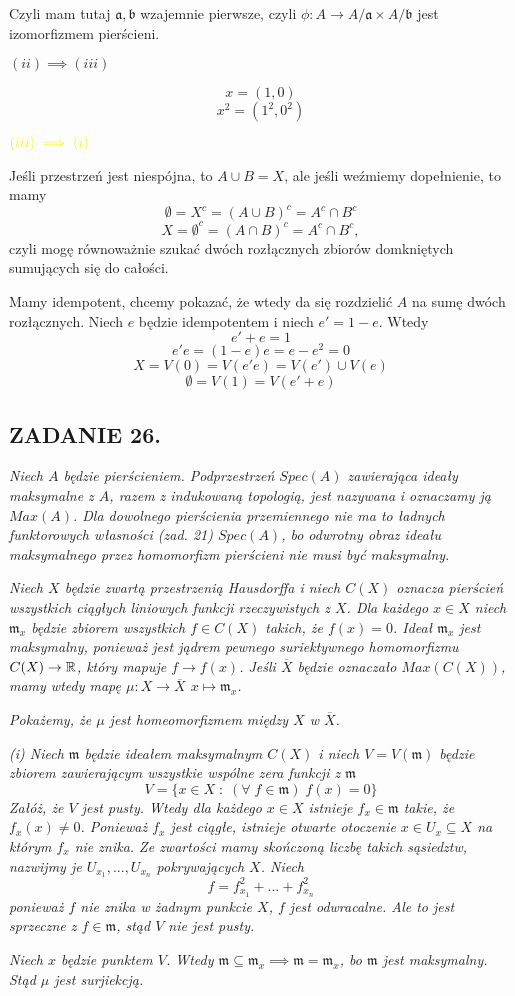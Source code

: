 \documentclass{article}
\begin{document}
Czyli mam tutaj $\mathfrak{a},\mathfrak{b}$ wzajemnie pierwsze, czyli $\phi:A\to A/\mathfrak{a}\times A/\mathfrak{b}$ jest izomorfizmem pierścieni.

$(ii)\implies (iii)$

$$x=(1, 0)$$
$$x^2=(1^2, 0^2)$$

$\color{yellow}(iii)\implies(i)$

Jeśli przestrzeń jest niespójna, to $A\cup B=X$, ale jeśli weźmiemy dopełnienie, to mamy 
$$\emptyset=X^c=(A\cup B)^c=A^c\cap B^c$$
$$X=\emptyset^c=(A\cap B)^c=A^c\cap B^c,$$ czyli mogę równoważnie szukać dwóch rozłącznych zbiorów domkniętych sumujących się do całości.

Mamy idempotent, chcemy pokazać, że wtedy da się rozdzielić $A$ na sumę dwóch rozłącznych. Niech $e$ będzie idempotentem i niech $e'=1-e$. Wtedy
$$e'+e=1$$
$$e'e=(1-e)e=e-e^2=0$$
$$X=V(0)=V(e'e)=V(e')\cup V(e)$$
$$\emptyset=V(1)=V(e'+e)$$

\subsection*{ZADANIE 26.}
\emph{\color{pink}Niech $A$ będzie pierścieniem. Podprzestrzeń $Spec(A)$ zawierająca ideały maksymalne z $A$, razem z indukowaną topologią, jest nazywana}\emph{\color{pink} i oznaczamy ją $Max(A)$. Dla dowolnego pierścienia przemiennego nie ma to ładnych funktorowych własności (zad. 21) $Spec(A)$, bo odwrotny obraz ideału maksymalnego przez homomorfizm pierścieni nie musi być maksymalny.}

\emph{\color{pink}Niech $X$ będzie zwartą przestrzenią Hausdorffa i niech $C(X)$ oznacza pierścień wszystkich ciągłych liniowych funkcji rzeczywistych z $X$. Dla każdego $x\in X$ niech $\mathfrak{m}_x$ będzie zbiorem wszystkich $f\in C(X)$ takich, że $f(x)=0$. Ideał $\mathfrak{m}_x$ jest maksymalny, ponieważ jest jądrem pewnego suriektywnego homomorfizmu $C(X)\to\mathbb{R}$, który mapuje $f\to f(x)$. Jeśli $\overline X$ będzie oznaczało $Max(C(X))$, mamy wtedy mapę $\mu :X\to\overline X$ $x\mapsto \mathfrak{m}_x$.}

\emph{\color{pink}Pokażemy, że $\mu$ jest homeomorfizmem między $X$ w $\overline X$.}

{\color{yellow}\emph{(i) Niech $\mathfrak{m}$ będzie ideałem maksymalnym $C(X)$ i niech $V =V(\mathfrak{m})$ będzie zbiorem zawierającym wszystkie wspólne zera funkcji z $\mathfrak{m}$}
$$V=\{x\in X\;:\;(\forall\;f\in\mathfrak{m})\;f(x)=0\}$$
\emph{Załóż, że $V$ jest pusty. Wtedy dla każdego $x\in X$ istnieje $f_x\in\mathfrak{m}$ takie, że $f_x(x)\neq 0$. Ponieważ $f_x$ jest ciągłe, istnieje otwarte otoczenie $x\in U_x\subseteq X$ na którym $f_x$ nie znika. Ze zwartości mamy skończoną liczbę takich sąsiedztw, nazwijmy je $U_{x_1},...,U_{x_n}$ pokrywających $X$. Niech}
$$f=f_{x_1}^2+...+f_{x_n}^2$$
\emph{ponieważ $f$ nie znika w żadnym punkcie $X$, $f$ jest odwracalne. Ale to jest sprzeczne z $f\in\mathfrak{m}$, stąd $V$ nie jest pusty.}

\emph{Niech $x$ będzie punktem $V$. Wtedy $\mathfrak{m}\subseteq\mathfrak{m}_x\implies \mathfrak{m}=\mathfrak{m}_x$, bo $\mathfrak{m}$ jest maksymalny. Stąd $\mu$ jest surjiekcją.}}
\end{document}
